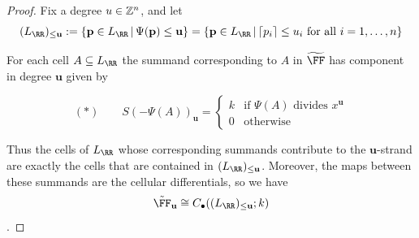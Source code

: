 \documentclass{amsart}
\begin{document}
\begin{proof}

%
%
%
%

Fix a degree $u\in \mathbb Z^n$, and let
 \[(L_{\RR})_{\leq \mathbf{u}}:= \{\mathbf{p}\in L_{\RR} \,|\, \Psi(\mathbf{p})\leq \mathbf{u}\} = \{\mathbf{p}\in L_{\RR} \,|\, \lceil p_i\rceil \leq u_i\text{ for all } i=1,\ldots,n\}\]

For each cell $A\subseteq L_{\RR}$ the summand corresponding to $A$ in $\tF$ has component in degree $\mathbf{u}$ given by

 \[  (*)\qquad S(-\Psi(A))_{\mathbf{u}} =
  \begin{cases}
    k & \text{if }\Psi(A)\text{ divides } x^{\mathbf{u}}\\
    0 & \text{otherwise}
  \end{cases}\]

Thus the cells of $L_{\RR}$ whose corresponding summands contribute to the $\mathbf u$-strand are exactly the cells that are contained in $(L_{\RR})_{\leq \mathbf{u}}$. Moreover, the maps between these summands are the cellular differentials, so we have
  \[\tilde \FF_{\mathbf{u}} \cong C_\bullet((L_{\RR})_{\leq \mathbf{u}};k)\].
  

\end{proof}
\end{document}
